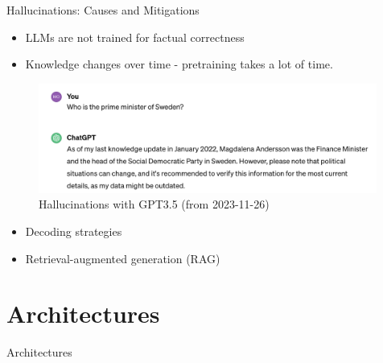 \documentclass[10pt]{beamer}
\begin{document}
\begin{frame}{Hallucinations: Causes and Mitigations}
\begin{itemize}
\item LLMs are not trained for factual correctness
\item Knowledge changes over time - pretraining takes a lot of time. %
\end{itemize}
\begin{figure}[h]
\centering
\includegraphics[width=0.99\textwidth]{fig/hall2_gpt35}
\caption{Hallucinations with GPT3.5 (from 2023-11-26)}
\end{figure}
\begin{itemize}
\pause
\item Decoding strategies %
\item Retrieval-augmented generation (RAG) %
\end{itemize}

\end{frame}


\section{Architectures}


\begin{frame}{Architectures}

\end{frame}
\end{document}
